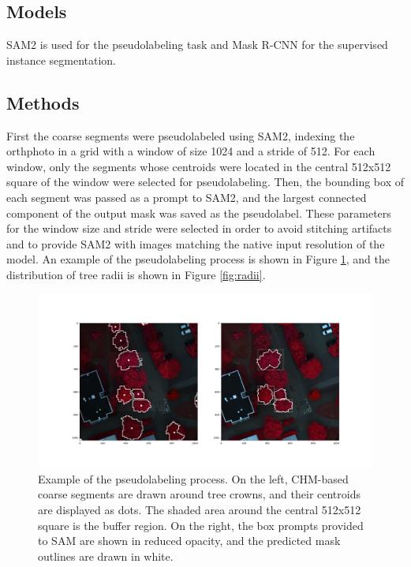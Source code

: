 \documentclass[english, 12pt, a4paper, sci, utf8, a-2b, online]{aaltothesis}
\begin{document}
\subsection{Models}

SAM2 is used for the pseudolabeling task and Mask R-CNN \cite{maskrcnn} for the supervised instance segmentation.

\subsection{Methods}

First the coarse segments were pseudolabeled using SAM2, indexing the orthphoto in a grid with a window of size 1024 and a stride of 512. For each window, only the segments whose centroids were located in the central 512x512 square of the window were selected for pseudolabeling. Then, the bounding box of each segment was passed as a prompt to SAM2, and the largest connected component of the output mask was saved as the pseudolabel. These parameters for the window size and stride were selected in order to avoid stitching artifacts and to provide SAM2 with images matching the native input resolution of the model. An example of the pseudolabeling process is shown in Figure \ref{fig:pseudolabel}, and the distribution of tree radii is shown in Figure \ref{fig:radii}.

\begin{figure}[h]
    \centering
    \includegraphics[width=1.0\textwidth]{figures/pseudolabel-example.png}
    \caption{Example of the pseudolabeling process. On the left, CHM-based coarse segments are drawn around tree crowns, and their centroids are displayed as dots. The shaded area around the central 512x512 square is the buffer region. On the right, the box prompts provided to SAM are shown in reduced opacity, and the predicted mask outlines are drawn in white.}
    \label{fig:pseudolabel}
\end{figure}
\end{document}
